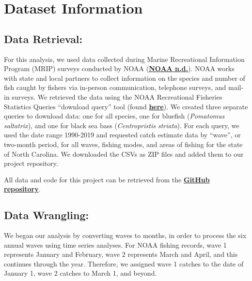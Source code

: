 \documentclass[
  12pt,
]{article}
\begin{document}
\newpage

\hypertarget{dataset-information}{%
\section{Dataset Information}\label{dataset-information}}

\hypertarget{data-retrieval}{%
\subsection{Data Retrieval:}\label{data-retrieval}}

For this analysis, we used data collected during Marine Recreational
Information Program (MRIP) surveys conducted by NOAA
(\href{https://www.fisheries.noaa.gov/recreational-fishing-data/about-marine-recreational-information-program}{\textbf{NOAA
n.d.}}). NOAA works with state and local partners to collect information
on the species and number of fish caught by fishers via in-person
communication, telephone surveys, and mail-in surveys. We retrieved the
data using the NOAA Recreational Fisheries Statistics Queries ``download
query'' tool (found
\href{https://www.fisheries.noaa.gov/data-tools/recreational-fisheries-statistics-queries}{\textbf{here}}).
We created three separate queries to download data: one for all species,
one for bluefish (\emph{Pomatomus saltatrix}), and one for black sea
bass (\emph{Centropristis striata}). For each query, we used the date
range 1990-2019 and requested catch estimate data by ``wave'', or
two-month period, for all waves, fishing modes, and areas of fishing for
the state of North Carolina. We downloaded the CSVs as ZIP files and
added them to our project repository.

All data and code for this project can be retrieved from the
\href{https://github.com/ardathdixon/Data_FinalProject}{\textbf{GitHub
repository}}.

\hypertarget{data-wrangling}{%
\subsection{Data Wrangling:}\label{data-wrangling}}

We began our analysis by converting waves to months, in order to process
the six annual waves using time series analyses. For NOAA fishing
records, wave 1 represents January and February, wave 2 represents March
and April, and this continues through the year. Therefore, we assigned
wave 1 catches to the date of January 1, wave 2 catches to March 1, and
beyond.
\end{document}
